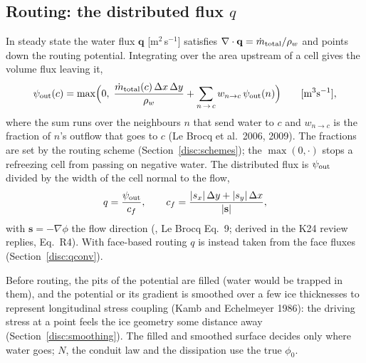 \subsection{Routing: the distributed flux $q$}\label{phys:routing}
In steady state the water flux $\mathbf q$ [m$^2$\,s$^{-1}$] satisfies $\nabla\cdot\mathbf q = \dot m_{\rm total}/{\rho_w}$ and
points down the routing potential. Integrating over the area upstream of a cell gives the volume flux leaving it,
\begin{equation}\label{eq:psi}
{\psi_{\rm out}}(c) = \max\Bigl(0,\; \frac{\dot m_{\rm total}(c)\,\Delta x\,\Delta y}{{\rho_w}} + \sum_{n\,\to\,c} w_{n\to c}\,{\psi_{\rm out}}(n)\Bigr)
\qquad[\text{m}^3\text{s}^{-1}],
\end{equation}
where the sum runs over the neighbours $n$ that send water to $c$ and $w_{n\to c}$ is the fraction of $n$'s outflow
that goes to $c$ (Le Brocq et al.\ 2006, 2009). The fractions are set by the routing scheme
(Section~\ref{disc:schemes}); the $\max(0,\cdot)$ stops a refreezing cell from passing on negative water. The
distributed flux is ${\psi_{\rm out}}$ divided by the width of the cell normal to the flow,
\begin{equation}\label{eq:corfac}
q = \frac{{\psi_{\rm out}}}{c_f}, \qquad c_f = \frac{|s_x|\,\Delta y + |s_y|\,\Delta x}{|\mathbf s|},
\end{equation}
with $\mathbf s = -\nabla\phi$ the flow direction (, Le Brocq Eq.~9; derived in the K24 review replies,
Eq.~R4). With face-based routing $q$ is instead taken from the face fluxes (Section~\ref{disc:qconv}).

Before routing, the pits of the potential are filled (water would be trapped in them), and the potential or its
gradient is smoothed over a few ice thicknesses to represent longitudinal stress coupling (Kamb and Echelmeyer
1986): the driving stress at a point feels the ice geometry some distance away (Section~\ref{disc:smoothing}). The
filled and smoothed surface decides only where water goes; $N$, the conduit law and the dissipation use the true
$\phi_0$.

